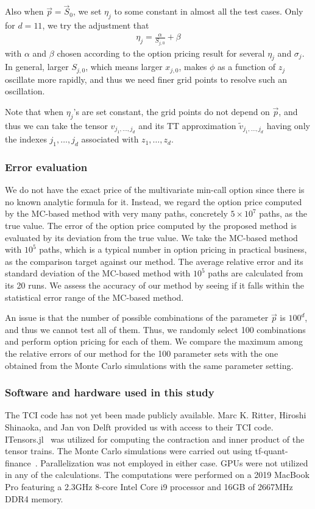 Also when $\vec{p}=\vec{S}_0$, we set $\eta_j$ to some constant in almost all the test cases.
Only for $d=11$, we try the adjustment that
\begin{align}
    \eta_j = \frac{\alpha}{S_{j,0}} + \beta
    \label{eq:fitting_S0}
\end{align}
with $\alpha$ and $\beta$ chosen according to the option pricing result for several $\eta_j$ and $\sigma_j$.
In general, larger $S_{j,0}$, which means larger $x_{j,0}$, makes $\phi$ as a function of $z_j$ oscillate more rapidly, and thus we need finer grid points to resolve such an oscillation.

Note that when $\eta_j$'s are set constant, the grid points do not depend on $\vec{p}$, and thus we can take the tensor $\hat{v}_{j_1,\ldots,j_d}$ and its TT approximation $\tilde{v}_{j_1,\ldots,j_d}$ having only the indexes $j_1,\ldots,j_d$ associated with $z_1,\ldots,z_d$.


\subsubsection*{Error evaluation}
We do not have the exact price of the multivariate min-call option since there is no known analytic formula for it.
Instead, we regard the option price computed by the MC-based method with very many paths, concretely $5 \times 10^7$ paths, as the true value.
The error of the option price computed by the proposed method is evaluated by its deviation from the true value.
We take the MC-based method with $10^5$ paths, which is a typical number in option pricing in practical business, as the comparison target against our method.
The average relative error and its standard deviation of the MC-based method with $10^5$ paths are calculated from its 20 runs.
We assess the accuracy of our method by seeing if it falls within the statistical error range of the MC-based method.

An issue is that the number of possible combinations of the parameter $\vec{p}$ is $100^d$, and thus we cannot test all of them.
Thus, we randomly select 100 combinations and perform option pricing for each of them. We compare the maximum among the relative errors of our method for the 100 parameter sets with the one obtained from the Monte Carlo simulations with the same parameter setting. 

\subsubsection*{Software and hardware used in this study}
The TCI code has not yet been made publicly available.
Marc K. Ritter, Hiroshi Shinaoka, and Jan von Delft provided us with access to their TCI code.
ITensors.jl~\cite{ITensor} was utilized for computing the contraction and inner product of the tensor trains. 
The Monte Carlo simulations were carried out using tf-quant-finance~\cite{monte}. Parallelization was not employed in either case. 
GPUs were not utilized in any of the calculations. 
The computations were performed on a 2019 MacBook Pro featuring a 2.3GHz 8-core Intel Core i9 processor and 16GB of 2667MHz DDR4 memory.

